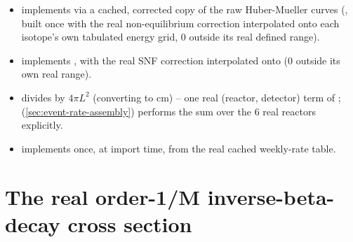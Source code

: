 \begin{implbox}
\begin{itemize}
  \item {} implements
     via a cached, corrected copy of
    the raw Huber-Mueller curves (, built
    once with the real non-equilibrium correction interpolated onto each
    isotope's own tabulated energy grid, 0 outside its real defined range).
  \item {} implements
    , with the real SNF correction
    interpolated onto  (0 outside its own real range).
  \item {}
    divides by $4\pi L^2$ (converting  to cm) -- one
    real (reactor, detector) term of ;
    (\cref{sec:event-rate-assembly}) performs the sum over the 6 real
    reactors explicitly.
  \item {}
    implements  once, at import time,
    from the real cached weekly-rate table.
\end{itemize}
\end{implbox}

\section{The real order-1/M inverse-beta-decay cross section}
\label{sec:ibd-cross-section}


